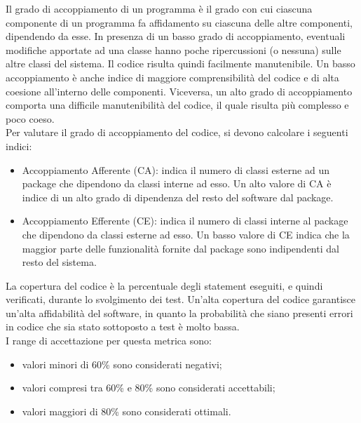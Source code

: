 		Il grado di accoppiamento di un programma è il grado con cui ciascuna componente di un programma fa affidamento su ciascuna delle altre componenti, dipendendo da esse. In presenza di un basso grado di accoppiamento, eventuali modifiche apportate ad una classe hanno poche ripercussioni (o nessuna) sulle altre classi del sistema. Il codice risulta quindi facilmente manutenibile. Un basso accoppiamento è anche indice di maggiore comprensibilità del codice e di alta coesione all'interno delle componenti. Viceversa, un alto grado di accoppiamento comporta una difficile manutenibilità del codice, il quale risulta più complesso e poco coeso.\\
		Per valutare il grado di accoppiamento del codice, si devono calcolare i seguenti indici:
		\begin{itemize}
			\item Accoppiamento Afferente (CA): indica il numero di classi esterne ad un package che dipendono da classi interne ad esso. Un alto valore di CA è indice di un alto grado di dipendenza del resto del software dal package.
			\item Accoppiamento Efferente (CE): indica il numero di classi interne al package che dipendono da classi esterne ad esso. Un basso valore di CE indica che la maggior parte delle funzionalità fornite dal package sono indipendenti dal resto del sistema.
		\end{itemize}
		La copertura del codice è la percentuale degli statement eseguiti, e quindi verificati, durante lo svolgimento dei test. Un'alta copertura del codice garantisce un'alta affidabilità del software, in quanto la probabilità che siano presenti errori in codice che sia stato sottoposto a test è molto bassa.\\
		I range di accettazione per questa metrica sono:
		\begin{itemize}
			\item valori minori di 60\% sono considerati negativi;
			\item valori compresi tra 60\% e 80\% sono considerati accettabili;
			\item valori maggiori di 80\% sono considerati ottimali.
		\end{itemize}
